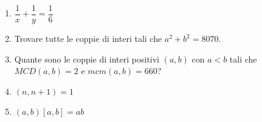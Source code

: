 \documentclass[a4paper]{article}
\theoremstyle{remark}
\theoremstyle{definition}
\begin{document}
\begin{multicols}{2}
\begin{enumerate}
		
		\item $ \dfrac{1}{x} + \dfrac{1}{y} = \dfrac{1}{6} $
		
		\item Trovare tutte le coppie di interi tali che $ a^2 + b^2 = 8070 $.
		
		\item Quante sono le coppie di interi positivi $(a,b)$ con $a<b$ tali che $MCD(a,b)=2$ e $mcm(a,b)=660$?
		
		\item $ (n, n+1) = 1 $
		
		\item $ (a, b)[a, b] = ab $
		
	\end{enumerate}
\end{multicols}

\newpage
\end{document}

